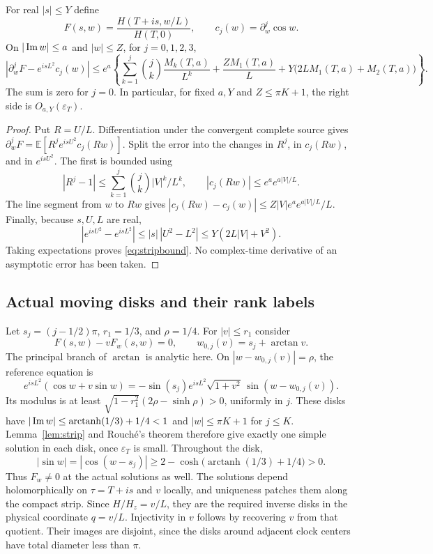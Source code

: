\begin{lemma}
\label{lem:strip}
For real $|s|\le Y$ define
\[
 F(s,w)=\frac{H(T+is,w/L)}{H(T,0)},\qquad
 c_j(w)=\partial_w^j\cos w.
\]
On $|\operatorname{Im} w|\le a$ and $|w|\le Z$, for $j=0,1,2,3$,
\begin{equation}
 |\partial_w^jF-e^{isL^2}c_j(w)|\le
 e^a\left\{
 \sum_{k=1}^j\binom jk\frac{M_k(T,a)}{L^k}
 +\frac{ZM_1(T,a)}L
 +Y\bigl(2LM_1(T,a)+M_2(T,a)\bigr)\right\}.
 \label{eq:stripbound}
\end{equation}
The sum is zero for $j=0$. In particular, for fixed $a,Y$ and
$Z\le\pi K+1$, the right side is $O_{a,Y}(\varepsilon_T)$.
\end{lemma}
\begin{proof}
Put $R=U/L$. Differentiation under the convergent complete source
gives $\partial_w^jF=\mathbb E[R^je^{isU^2}c_j(Rw)]$.
Split the error into the changes in $R^j$, in $c_j(Rw)$, and in
$e^{isU^2}$. The first is bounded using
\[
 |R^j-1|\le\sum_{k=1}^j\binom jk|V|^k/L^k,
 \qquad |c_j(Rw)|\le e^a e^{a|V|/L}.
\]
The line segment from $w$ to $Rw$ gives
$|c_j(Rw)-c_j(w)|\le Z|V|e^ae^{a|V|/L}/L$.
Finally, because $s,U,L$ are real,
\[
 |e^{isU^2}-e^{isL^2}|
 \le |s|\,|U^2-L^2|\le Y(2L|V|+V^2).
\]
Taking expectations proves \eqref{eq:stripbound}. No complex-time
derivative of an asymptotic error has been taken.
\end{proof}

\subsection{Actual moving disks and their rank labels}

Let $s_j=(j-1/2)\pi$, $r_1=1/3$, and $\rho=1/4$.
For $|v|\le r_1$ consider
\begin{equation}
 F(s,w)-vF_w(s,w)=0,
 \qquad w_{0,j}(v)=s_j+\arctan v.
 \label{eq:rootinverse}
\end{equation}
The principal branch of $\arctan$ is analytic here. On
$|w-w_{0,j}(v)|=\rho$, the reference equation is
\[
 e^{isL^2}(\cos w+v\sin w)
 =-\sin(s_j)e^{isL^2}\sqrt{1+v^2}\,
       \sin(w-w_{0,j}(v)).
\]
Its modulus is at least
$\sqrt{1-r_1^2}(2\rho-\sinh\rho)>0$, uniformly in $j$.
These disks have $|\operatorname{Im} w|\le\operatorname{arctanh}(1/3)+1/4<1$
and $|w|\le\pi K+1$ for $j\le K$.
Lemma~\ref{lem:strip} and Rouch\'e's theorem therefore give exactly
one simple solution in each disk, once $\varepsilon_T$ is small.
Throughout the disk,
\[
 |\sin w|=|\cos(w-s_j)|
 \ge2-\cosh\bigl(\operatorname{arctanh}(1/3)+1/4\bigr)>0.
\]
Thus $F_w\ne0$ at the actual solutions as well.
The solutions depend holomorphically on $\tau=T+is$ and $v$
locally, and uniqueness patches them along the compact strip.
Since $H/H_z=v/L$, they are the required inverse disks in the
physical coordinate $q=v/L$.
Injectivity in $v$ follows by recovering $v$ from that quotient.
Their images are disjoint, since the disks around adjacent clock
centers have total diameter less than $\pi$.


